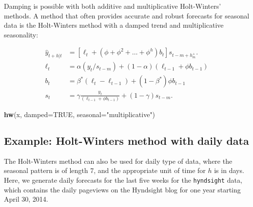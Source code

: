 \documentclass[]{book}
\newenvironment{Shaded}{\begin{snugshade}}{\end{snugshade}}
\newcommand{\DataTypeTok}[1]{\textcolor[rgb]{0.13,0.29,0.53}{#1}}
\newcommand{\DecValTok}[1]{\textcolor[rgb]{0.00,0.00,0.81}{#1}}
\newcommand{\KeywordTok}[1]{\textcolor[rgb]{0.13,0.29,0.53}{\textbf{#1}}}
\newcommand{\NormalTok}[1]{#1}
\newcommand{\OperatorTok}[1]{\textcolor[rgb]{0.81,0.36,0.00}{\textbf{#1}}}
\newcommand{\OtherTok}[1]{\textcolor[rgb]{0.56,0.35,0.01}{#1}}
\newcommand{\StringTok}[1]{\textcolor[rgb]{0.31,0.60,0.02}{#1}}
\begin{document}
Damping is possible with both additive and multiplicative Holt-Winters' methods. A method that often provides accurate and robust forecasts for seasonal data is the Holt-Winters method with a damped trend and multiplicative seasonality:

\begin{align*}
  \hat{y}_{t+h|t} &= \left[\ell_{t} + (\phi+\phi^2 + \dots + \phi^{h})b_{t}\right]s_{t-m+h_{m}^{+}}. \\
  \ell_{t} &= \alpha(y_{t} / s_{t-m}) + (1 - \alpha)(\ell_{t-1} + \phi b_{t-1})\\
  b_{t} &= \beta^*(\ell_{t} - \ell_{t-1}) + (1 - \beta^*)\phi b_{t-1}             \\
  s_{t} &= \gamma \frac{y_{t}}{(\ell_{t-1} + \phi b_{t-1})} + (1 - \gamma)s_{t-m}.
\end{align*}

\begin{Shaded}
\begin{Highlighting}[]
\KeywordTok{hw}\NormalTok{(x, }\DataTypeTok{damped=}\OtherTok{TRUE}\NormalTok{, }\DataTypeTok{seasonal=}\StringTok{"multiplicative"}\NormalTok{)}
\end{Highlighting}
\end{Shaded}

\hypertarget{example-holt-winters-method-with-daily-data}{%
\subsection*{Example: Holt-Winters method with daily data}\label{example-holt-winters-method-with-daily-data}}

The Holt-Winters method can also be used for daily type of data, where the seasonal pattern is of length 7, and the appropriate unit of time for \(h\) is in days. Here, we generate daily forecasts for the last five weeks for the \texttt{hyndsight} data, which contains the daily pageviews on the Hyndsight blog for one year starting April 30, 2014.

\begin{Shaded}
\end{Shaded}
\end{document}
